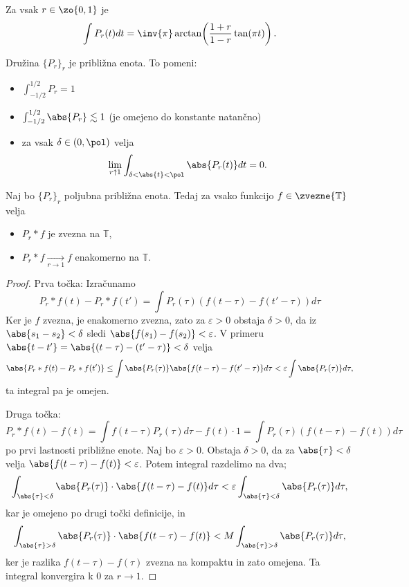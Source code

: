 
\begin{lema}
  Za vsak $r \in \zo{0,1}$ je
  \[
	\int P_r(t) dt
	= \inv{\pi} \arctan\!\left( \frac{1+r}{1-r} \tan(\pi t) \right).
  \]
\end{lema}

\begin{trditev}
  Družina $\{P_r\}_r$ je približna enota.
  To pomeni:
  \begin{itemize}
  \item $\int_{-1/2}^{1/2} P_r = 1$
  \item $\int_{-1/2}^{1/2} \abs{P_r} \lesssim 1$ (je omejeno do konstante
	natančno)
  \item za vsak $\delta \in (0, \pol)$ velja
	\[
	  \lim_{r \uparrow 1} \int_{\delta < \abs{t} < \pol} \abs{P_r(t)} dt
	  = 0.
	\]
  \end{itemize}
\end{trditev}


\begin{izrek}
  Naj bo $\{P_r\}_r$ poljubna približna enota.
  Tedaj za vsako funkcijo $f \in \zvezne{\mathbb{T}}$ velja
  \begin{itemize}
  \item $P_r * f$ je zvezna na $\mathbb{T}$,
  \item $P_r * f \xrightarrow[r \to 1]{} f$ enakomerno na $\mathbb{T}$.
  \end{itemize}
\end{izrek}

\begin{proof}
  Prva točka:
  Izračunamo
  \[
	P_r * f(t) - P_r * f(t')
	= \int P_r(\tau) (f(t-\tau) - f(t'-\tau)) d\tau
  \]
  Ker je $f$ zvezna, je enakomerno zvezna, zato za $\varepsilon > 0$ obstaja
  $\delta > 0$, da iz $\abs{s_1 - s_2} < \delta$ sledi $\abs{f(s_1) - f(s_2)} <
  \varepsilon$.
  V primeru $\abs{t-t'} = \abs{(t-\tau) - (t'-\tau)} < \delta$ velja
  \[
	\abs{P_r*f(t) - P_r*f(t')}
	\le \int \abs{P_r(\tau)} \abs{f(t-\tau) - f(t'-\tau)} d\tau
	< \varepsilon \int \abs{P_r(\tau)} d\tau,
  \]
  ta integral pa je omejen.

  Druga točka:
  \[
	P_r * f(t) - f(t)
	= \int f(t-\tau) P_r(\tau) d\tau - f(t) \cdot 1
	= \int P_r(\tau) (f(t-\tau) - f(t)) d\tau
  \]
  po prvi lastnosti približne enote.
  Naj bo $\varepsilon > 0$.
  Obstaja $\delta > 0$, da za $\abs{\tau} < \delta$ velja $\abs{f(t-\tau) -
	f(t)} < \varepsilon$.
  Potem integral razdelimo na dva;
  \[
	\int_{\abs{\tau} < \delta} \abs{P_r(\tau)} \cdot \abs{f(t-\tau) - f(t)}
	d\tau
	< \varepsilon \int_{\abs{\tau} < \delta} \abs{P_r(\tau)} d\tau,
  \]
  kar je omejeno po drugi točki definicije, in
  \[
	\int_{\abs{\tau} > \delta} \abs{P_r(\tau)} \cdot \abs{f(t-\tau) - f(t)}
	< M \int_{\abs{\tau} > \delta} \abs{P_r(\tau)} d\tau,
  \]
  ker je razlika $f(t-\tau) - f(\tau)$ zvezna na kompaktu in zato omejena.
  Ta integral konvergira k $0$ za $r \to 1$.
\end{proof}

